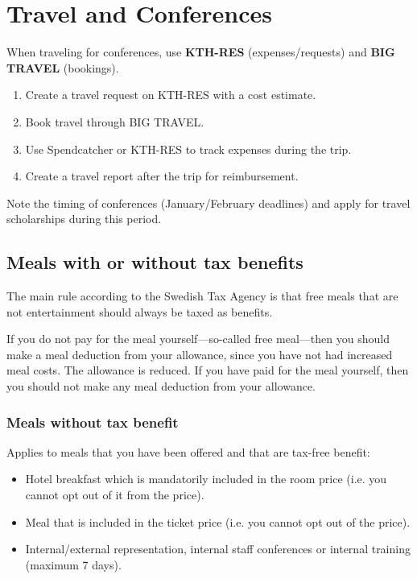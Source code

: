 \documentclass{article}
\begin{document}
\section{Travel and Conferences}
When traveling for conferences, use \textbf{KTH-RES} (expenses/requests) and \textbf{BIG TRAVEL} (bookings).
\begin{enumerate}
    \item Create a travel request on KTH-RES with a cost estimate.
    \item Book travel through BIG TRAVEL.
    \item Use Spendcatcher or KTH-RES to track expenses during the trip.
    \item Create a travel report after the trip for reimbursement.
\end{enumerate}
Note the timing of conferences (January/February deadlines) and apply for travel scholarships during this period.

\subsection{Meals with or without tax benefits}

The main rule according to the Swedish Tax Agency is that free meals that are not entertainment should always be taxed as benefits.

If you do not pay for the meal yourself---so-called free meal---then you should make a meal deduction from your allowance, since you have not had increased meal costs. The allowance is reduced. If you have paid for the meal yourself, then you should not make any meal deduction from your allowance.

\subsubsection{Meals without tax benefit}

Applies to meals that you have been offered and that are tax-free benefit:

\begin{itemize}
    \item Hotel breakfast which is mandatorily included in the room price (i.e. you cannot opt out of it from the price).
    \item Meal that is included in the ticket price (i.e. you cannot opt out of the price).
    \item Internal/external representation, internal staff conferences or internal training (maximum 7 days).
\end{itemize}
\end{document}
